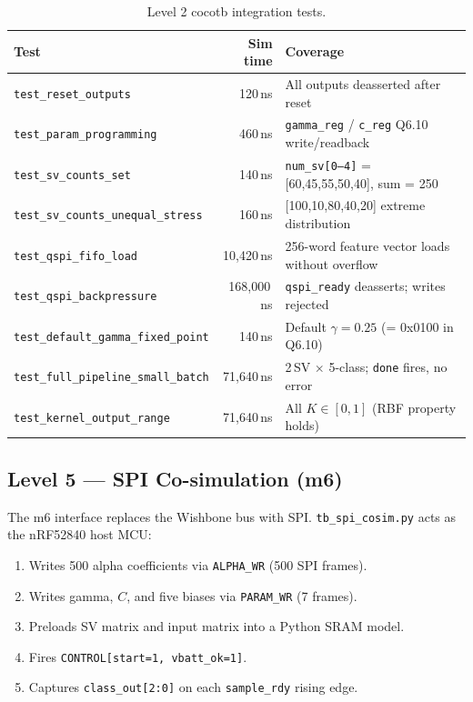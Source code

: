 \documentclass[11pt]{article}
\begin{document}
\begin{table}[H]
  \centering
  \caption{Level 2 cocotb integration tests.}
  \label{tab:l2}
  \small
  \begin{tabular}{lrl}
    \toprule
    Test & Sim time & Coverage \\
    \midrule
    \texttt{test\_reset\_outputs}          & 120\,ns  & All outputs deasserted after reset \\
    \texttt{test\_param\_programming}      & 460\,ns  & \texttt{gamma\_reg} / \texttt{c\_reg} Q6.10 write/readback \\
    \texttt{test\_sv\_counts\_set}         & 140\,ns  & \texttt{num\_sv[0--4]} = [60,45,55,50,40], sum = 250 \\
    \texttt{test\_sv\_counts\_unequal\_stress} & 160\,ns & [100,10,80,40,20] extreme distribution \\
    \texttt{test\_qspi\_fifo\_load}        & 10{,}420\,ns & 256-word feature vector loads without overflow \\
    \texttt{test\_qspi\_backpressure}      & 168{,}000\,ns & \texttt{qspi\_ready} deasserts; writes rejected \\
    \texttt{test\_default\_gamma\_fixed\_point} & 140\,ns & Default $\gamma = 0.25$ (= 0x0100 in Q6.10) \\
    \texttt{test\_full\_pipeline\_small\_batch} & 71{,}640\,ns & 2\,SV $\times$ 5-class; \texttt{done} fires, no error \\
    \texttt{test\_kernel\_output\_range}   & 71{,}640\,ns & All $K \in [0,1]$ (RBF property holds) \\
    \bottomrule
  \end{tabular}
\end{table}

\subsection{Level 5 --- SPI Co-simulation (m6)}

The m6 interface replaces the Wishbone bus with SPI.  \texttt{tb\_spi\_cosim.py}
acts as the nRF52840 host MCU:
\begin{enumerate}[noitemsep]
  \item Writes 500 alpha coefficients via \texttt{ALPHA\_WR} (500 SPI frames).
  \item Writes gamma, $C$, and five biases via \texttt{PARAM\_WR} (7 frames).
  \item Preloads SV matrix and input matrix into a Python SRAM model.
  \item Fires \texttt{CONTROL[start=1, vbatt\_ok=1]}.
  \item Captures \texttt{class\_out[2:0]} on each \texttt{sample\_rdy} rising edge.
\end{enumerate}
\end{document}

